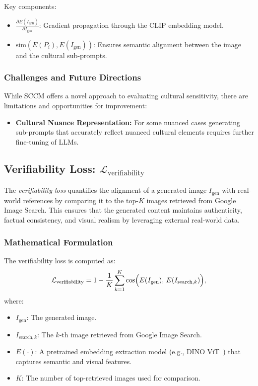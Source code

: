 Key components:
\begin{itemize}
    \item \(\frac{\partial E(I_{\text{gen}})}{\partial I_{\text{gen}}}\): Gradient propagation through the CLIP embedding model.
    \item \(\text{sim}(E(P_i), E(I_{\text{gen}}))\): Ensures semantic alignment between the image and the cultural sub-prompts.
\end{itemize}

\subsubsection{Challenges and Future Directions}
While SCCM offers a novel approach to evaluating cultural sensitivity, there are limitations and opportunities for improvement:
\begin{itemize}
    \item \textbf{Cultural Nuance Representation:} For some nuanced cases generating sub-prompts that accurately reflect nuanced cultural elements requires further fine-tuning of LLMs.
\end{itemize}


\subsection{Verifiability Loss: \(\mathcal{L}_{\text{verifiability}}\)}

The \emph{verifiability loss} quantifies the alignment of a generated image \(I_{\text{gen}}\) with real-world references by comparing it to the top-\(K\) images retrieved from Google Image Search. This ensures that the generated content maintains authenticity, factual consistency, and visual realism by leveraging external real-world data.


\subsubsection{Mathematical Formulation}
The verifiability loss is computed as:
\[
\mathcal{L}_{\text{verifiability}}
=
1
-
\frac{1}{K}
\sum_{k=1}^{K}
\cos\Bigl(
E(I_{\text{gen}}),\,
E(I_{\text{search},k})
\Bigr),
\]
where:
\begin{itemize}
    \item \(I_{\text{gen}}\): The generated image.
    \item \(I_{\text{search},k}\): The \(k\)-th image retrieved from Google Image Search.
    \item \(E(\cdot)\): A pretrained embedding extraction model (e.g., DINO ViT~\cite{caron2021emerging}) that captures semantic and visual features.
    \item \(K\): The number of top-retrieved images used for comparison.
\end{itemize}

